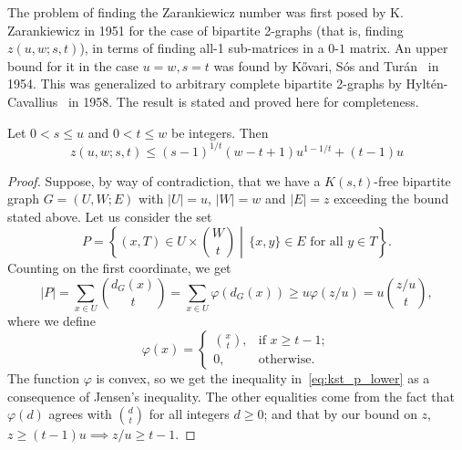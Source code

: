 The problem of finding the Zarankiewicz number was first posed by K. Zarankiewicz in 1951 for the
case of bipartite 2-graphs (that is, finding $z(u, w; s, t)$),
in terms of finding all-1 sub-matrices in a $0$-$1$ matrix.
An upper bound for it in the case $u=w, s=t$ was found by Kővari, Sós and Turán~\cite{Kovari1954} in 1954.
This was generalized to arbitrary complete
bipartite 2-graphs by Hyltén-Cavallius~\cite{Hylten1958} in 1958.
The result is stated and proved here for completeness.

\begin{theorem} \label{thm:kst}
    Let $0 < s \leq u$ and $0 < t \leq w$ be integers.
    Then
    \[z(u, w; s, t) \leq (s - 1)^{1 / t}(w - t + 1)u^{1 - 1 / t} + (t - 1)u\]
    \begin{proof}
        Suppose, by way of contradiction, that we have a $K(s, t)$-free bipartite graph $G = (U, W; E)$
        with $|U| = u$, $|W| = w$ and $|E| = z$ exceeding the bound stated above.
        Let us consider the set
        \[
            P = \left\{ (x, T) \in U \times \binom{W}{t}
            \middle\vert\, \{x, y\} \in E \text{ for all } y \in T \right\}.
        \]
        Counting on the first coordinate, we get
        \begin{equation} \label{eq:kst_p_lower}
            |P| =
            \sum_{x \in U} \binom{d_G(x)}{t} =
            \sum_{x \in U} \varphi(d_G(x)) \geq
            u \varphi(z/u) =
            u \binom{z / u}{t},
        \end{equation}
        where we define
        \[
            \varphi(x) =
            \begin{cases}
                \binom{x}{t}, & \text{if } x \geq t - 1; \\
                0, & \text{otherwise.}
            \end{cases}
        \]
        The function $\varphi$ is convex, so we get the inequality in~\eqref{eq:kst_p_lower}
        as a consequence of Jensen's inequality.
        The other equalities come from the fact that $\varphi(d)$ agrees
        with $\binom{d}{t}$ for all integers $d \geq 0$;
        and that by our bound on $z$, $z \geq (t-1)u \implies z/u \geq t - 1$.


\end{proof}
\end{theorem}
